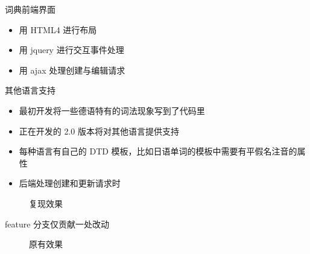 \documentclass[notheorems,xetex]{beamer}
\begin{document}
\begin{frame}{词典前端界面}
\begin{itemize}
	\item 用 HTML4 进行布局
	\item 用 jquery 进行交互事件处理
	\item 用 ajax 处理创建与编辑请求
\end{itemize}
\begin{figure}
\end{figure}

\end{frame}
\begin{frame}{其他语言支持}
\begin{itemize}
	\item 最初开发将一些德语特有的词法现象写到了代码里
	\item 正在开发的 2.0 版本将对其他语言提供支持
\end{itemize}
\begin{itemize}
	\item 每种语言有自己的 DTD 模板，比如日语单词的模板中需要有平假名注音的属性
	\item 后端处理创建和更新请求时
\end{itemize}
\begin{figure}
\caption{复现效果}
\end{figure}
\begin{center}
feature 分支仅贡献一处改动
\end{center}
\begin{figure}
	\caption{原有效果}
\end{figure}
\end{frame}




\end{document}
